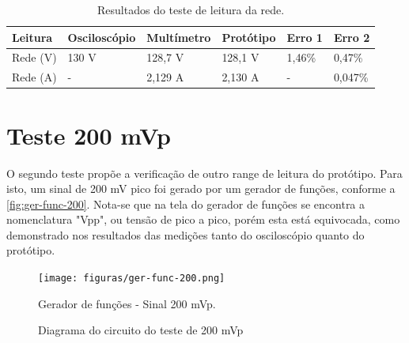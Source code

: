 \begin{table}[!ht]
    \centering
    \caption{Resultados do teste de leitura da rede.}
    \vspace*{5mm}
    \label{tab:resultados-01}
    \begin{tabular}{ l l l l l l }
        \hline
        \textbf{Leitura} & \textbf{Osciloscópio} & \textbf{Multímetro} & \textbf{Protótipo}  & \textbf{Erro 1}  & \textbf{Erro 2}  \\ \hline
        Rede (V)         & 130 V                 & 128,7 V             & 128,1 V             & 1,46\%           & 0,47\%           \\ 
        Rede (A)         & -                     & 2,129 A             & 2,130 A             & -                & 0,047\%          \\ \hline
    \end{tabular}
    \fonte{}
\end{table}



\section{Teste 200 mVp}\label{teste-200mv}

O segundo teste propõe a verificação de outro range de leitura do protótipo. Para isto, um sinal de 200 mV pico foi gerado por um gerador de funções, conforme a \autoref{fig:ger-func-200}. Nota-se que na tela do gerador de funções se encontra a nomenclatura "Vpp", ou tensão de pico a pico, porém esta está equivocada, como demonstrado nos resultados das medições tanto do osciloscópio quanto do protótipo.

\begin{figure}[htb!]
    \caption{Gerador de funções - Sinal 200 mVp.}
    \vspace*{5mm}
    \label{fig:ger-func-200}
    \texttt{[image: figuras/ger-func-200.png]}
    \fonte{}
\end{figure}

\begin{figure}[htb!]
    \caption{Diagrama do circuito do teste de 200 mVp}
    \vspace*{5mm}
    \label{fig:circ-200}
    \fonte{}
\end{figure}

